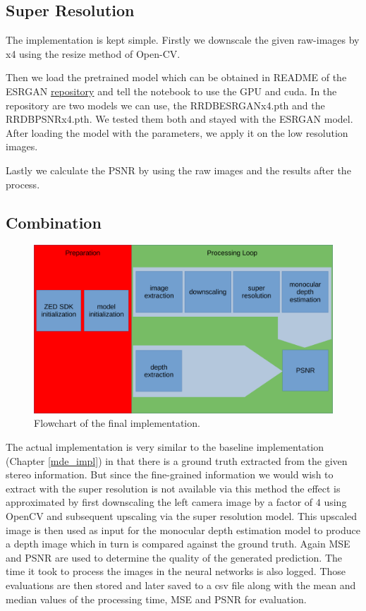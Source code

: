 \subsection{Super Resolution}

The implementation is kept simple. Firstly we downscale the given raw-images by x4 using the resize method of Open-CV.

Then we load the pretrained model which can be obtained in README  of the ESRGAN \href{https://github.com/xinntao/ESRGAN}{repository} and tell the notebook to use the GPU and cuda. In the repository are two models we can use, the RRDB\textunderscore ESRGAN\textunderscore x4.pth and the RRDB\textunderscore PSNR\textunderscore x4.pth. We tested them both and stayed with the ESRGAN model. After loading the model with the parameters, we apply it on the low resolution images.

Lastly we calculate the PSNR by using the raw images and the results after the process.

\subsection{Combination}

\begin{figure}[ht!]
    \begin{center}
        \includegraphics[scale=.5]{resources/general_plan.pdf}
        \caption{Flowchart of the final implementation.} \label{flowchart_general}
    \end{center}
\end{figure}

The actual implementation is very similar to the baseline implementation (Chapter \ref*{mde_impl}) in that there is a ground truth extracted from the given stereo information. But since the fine-grained information we would wish to extract with the super resolution is not available via this method the effect is approximated by first downscaling the left camera image by a factor of $4$ using OpenCV and subsequent upscaling via the super resolution model. This upscaled image is then used as input for the monocular depth estimation model to produce a depth image which in turn is compared against the ground truth. Again MSE and PSNR are used to determine the quality of the generated prediction. The time it took to process the images in the neural networks is also logged. Those evaluations are then stored and later saved to a csv file along with the mean and median values of the processing time, MSE and PSNR for evaluation.

